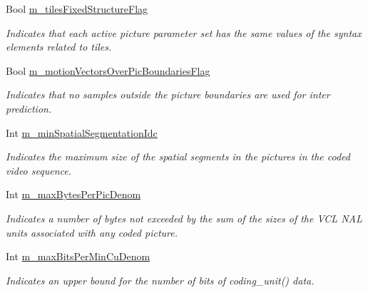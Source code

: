 \begin{DoxyCompactItemize}
\mbox{\label{class_t_app_enc_cfg_a72e6df73fff87104ea9296da404f1c9d}} 
Bool \hyperlink{class_t_app_enc_cfg_a72e6df73fff87104ea9296da404f1c9d}{m\+\_\+tiles\+Fixed\+Structure\+Flag}
\begin{DoxyCompactList}\small\item\em Indicates that each active picture parameter set has the same values of the syntax elements related to tiles. \end{DoxyCompactList}\item 
\mbox{\label{class_t_app_enc_cfg_a8cfc9fcf73d75c56fb81e4d8443fd7ce}} 
Bool \hyperlink{class_t_app_enc_cfg_a8cfc9fcf73d75c56fb81e4d8443fd7ce}{m\+\_\+motion\+Vectors\+Over\+Pic\+Boundaries\+Flag}
\begin{DoxyCompactList}\small\item\em Indicates that no samples outside the picture boundaries are used for inter prediction. \end{DoxyCompactList}\item 
\mbox{\label{class_t_app_enc_cfg_a099e10c553ea733d4269cbe2c3fda876}} 
Int \hyperlink{class_t_app_enc_cfg_a099e10c553ea733d4269cbe2c3fda876}{m\+\_\+min\+Spatial\+Segmentation\+Idc}
\begin{DoxyCompactList}\small\item\em Indicates the maximum size of the spatial segments in the pictures in the coded video sequence. \end{DoxyCompactList}\item 
\mbox{\label{class_t_app_enc_cfg_af331adeae40ad40fd82b6184ac50511e}} 
Int \hyperlink{class_t_app_enc_cfg_af331adeae40ad40fd82b6184ac50511e}{m\+\_\+max\+Bytes\+Per\+Pic\+Denom}
\begin{DoxyCompactList}\small\item\em Indicates a number of bytes not exceeded by the sum of the sizes of the V\+CL N\+AL units associated with any coded picture. \end{DoxyCompactList}\item 
\mbox{\label{class_t_app_enc_cfg_a6e30ec5f9dc7958bba5bde962172e95b}} 
Int \hyperlink{class_t_app_enc_cfg_a6e30ec5f9dc7958bba5bde962172e95b}{m\+\_\+max\+Bits\+Per\+Min\+Cu\+Denom}
\begin{DoxyCompactList}\small\item\em Indicates an upper bound for the number of bits of coding\+\_\+unit() data. \end{DoxyCompactList}\item 

\end{DoxyCompactItemize}
